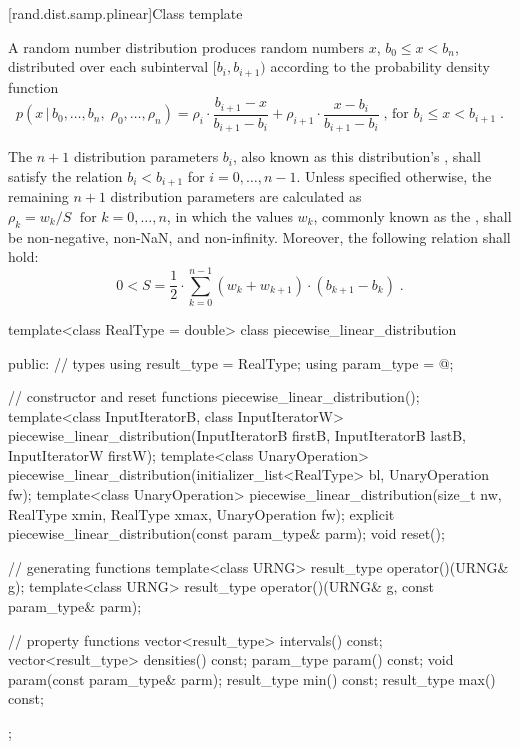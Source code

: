 [rand.dist.samp.plinear]{Class template }%
%

\pnum
A  random number distribution
produces random numbers $x$,
$ b_0 \leq x < b_n $,
distributed over each subinterval
$ [ b_i, b_{i+1} ) $
according to the probability density function
%
\[%
 p(x\,|\,b_0,\ldots,b_n,\;\rho_0,\ldots,\rho_n)
      = \rho_i     \cdot {\frac{b_{i+1} - x}{b_{i+1} - b_i}}
      + \rho_{i+1} \cdot {\frac{x - b_i}{b_{i+1} - b_i}}
\; \mbox{,}
\mbox{ for } b_i \le x < b_{i+1}
\; \mbox{.}
\]

\pnum
The $n+1$ distribution parameters $b_i$,
also known as this distribution's %
%
%
, shall satisfy the relation
 $ b_i < b_{i+1} $
for $i = 0, \ldots, n\!-\!1 $.
Unless specified otherwise,
the remaining $n+1$ distribution parameters are calculated as
$ \rho_k = {w_k / S} \; \mbox{ for } k = 0, \ldots, n $,
in which the values $w_k$,
commonly known as the %
%
%
, shall be non-negative, non-NaN, and non-infinity.
Moreover, the following relation shall hold:
\[%
 0 < S = \frac{1}{2}
       \cdot \sum_{k=0}^{n-1} (w_k + w_{k+1}) \cdot (b_{k+1} - b_k)
\; \mbox{.}
\]

\begin{codeblock}
template<class RealType = double>
 class piecewise_linear_distribution
{
public:
 // types
 using result_type = RealType;
 using param_type  = @\unspec@;

 // constructor and reset functions
 piecewise_linear_distribution();
 template<class InputIteratorB, class InputIteratorW>
   piecewise_linear_distribution(InputIteratorB firstB, InputIteratorB lastB,
                                 InputIteratorW firstW);
 template<class UnaryOperation>
   piecewise_linear_distribution(initializer_list<RealType> bl, UnaryOperation fw);
 template<class UnaryOperation>
   piecewise_linear_distribution(size_t nw, RealType xmin, RealType xmax, UnaryOperation fw);
 explicit piecewise_linear_distribution(const param_type& parm);
 void reset();

 // generating functions
 template<class URNG>
   result_type operator()(URNG& g);
 template<class URNG>
   result_type operator()(URNG& g, const param_type& parm);

 // property functions
 vector<result_type> intervals() const;
 vector<result_type> densities() const;
 param_type param() const;
 void param(const param_type& parm);
 result_type min() const;
 result_type max() const;
};
\end{codeblock}

